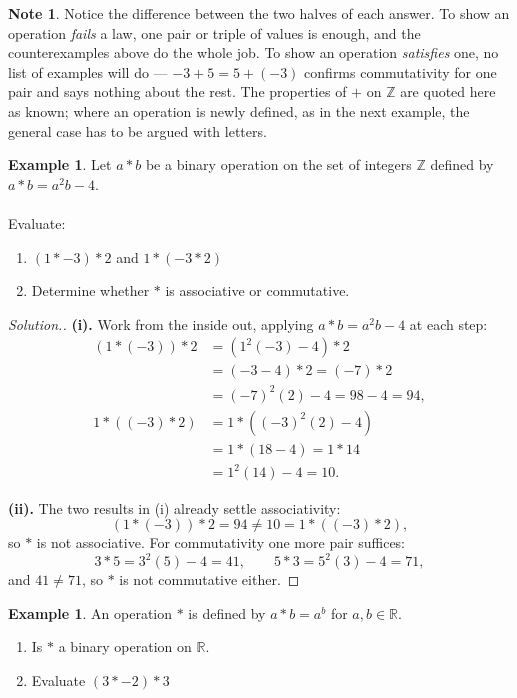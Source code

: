 \documentclass[11pt,a4paper]{article}
\theoremstyle{definition}
\newtheorem{example}[thm]{Example}
\newtheorem{note}[thm]{Note}
\newenvironment{solution}
  {\renewcommand{\qedsymbol}{}\begin{proof}[\textit{Solution}.]}
  {\end{proof}}
\begin{document}
\begin{note}
Notice the difference between the two halves of each answer. To show an
operation \emph{fails} a law, one pair or triple of values is enough, and the
counterexamples above do the whole job. To show an operation \emph{satisfies}
one, no list of examples will do --- $-3+5=5+(-3)$ confirms commutativity for one
pair and says nothing about the rest. The properties of $+$ on $\mathbb{Z}$ are
quoted here as known; where an operation is newly defined, as in the next
example, the general case has to be argued with letters.
\end{note}
\begin{example}

Let $a*b$ be a binary operation on the  set of integers $\mathbb{Z}$ defined by $a*b=a^2b-4$.\\\\
Evaluate:
\begin{enumerate}
\item[(i).] $(1*-3)*2$ and $1*(-3*2)$
\item[(ii).] Determine whether $*$ is associative or commutative.\\
\end{enumerate}
\end{example}
\begin{solution}

\textbf{(i).} Work from the inside out, applying $a*b=a^{2}b-4$ at each step:
\begin{align*}
\left(1*(-3)\right)*2 & = \left(1^{2}(-3)-4\right)*2\\
                      & = (-3-4)*2 = (-7)*2\\
                      & = (-7)^{2}(2)-4 = 98-4 = 94,\\[4pt]
1*\left((-3)*2\right) & = 1*\left((-3)^{2}(2)-4\right)\\
                      & = 1*(18-4) = 1*14\\
                      & = 1^{2}(14)-4 = 10 .
\end{align*}

\textbf{(ii).} The two results in (i) already settle associativity:
$$\left(1*(-3)\right)*2 = 94 \neq 10 = 1*\left((-3)*2\right),$$
so $*$ is not associative. For commutativity one more pair suffices:
$$3*5 = 3^{2}(5)-4 = 41,\qquad 5*3 = 5^{2}(3)-4 = 71,$$
and $41\neq71$, so $*$ is not commutative either.
\end{solution}
\begin{example}

An operation $*$ is defined by $a*b=a^b$ for $a,b \in \mathbb{R}$.
\begin{enumerate}
\item[(i).] Is $*$ a binary operation on $\mathbb{R}$.
\item[(ii).] Evaluate $(3*-2)*3$\\
\end{enumerate}
\end{example}
\end{document}
